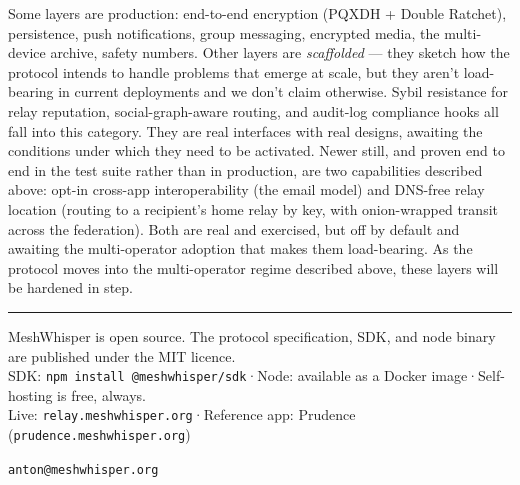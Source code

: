\documentclass[11pt, a4paper]{article}
\begin{document}
Some layers are production: end-to-end encryption (PQXDH + Double Ratchet), persistence, push notifications, group messaging, encrypted media, the multi-device archive, safety numbers. Other layers are \emph{scaffolded} --- they sketch how the protocol intends to handle problems that emerge at scale, but they aren't load-bearing in current deployments and we don't claim otherwise. Sybil resistance for relay reputation, social-graph-aware routing, and audit-log compliance hooks all fall into this category. They are real interfaces with real designs, awaiting the conditions under which they need to be activated. Newer still, and proven end to end in the test suite rather than in production, are two capabilities described above: opt-in cross-app interoperability (the email model) and DNS-free relay location (routing to a recipient's home relay by key, with onion-wrapped transit across the federation). Both are real and exercised, but off by default and awaiting the multi-operator adoption that makes them load-bearing. As the protocol moves into the multi-operator regime described above, these layers will be hardened in step.

\vspace{16pt}
\hrule
\vspace{10pt}
{\small
MeshWhisper is open source. The protocol specification, SDK, and node binary are published under the MIT licence.\\
SDK: \texttt{npm install @meshwhisper/sdk}\quad·\quad Node: available as a Docker image\quad·\quad Self-hosting is free, always.\\
Live: \texttt{relay.meshwhisper.org}\quad·\quad Reference app: Prudence (\texttt{prudence.meshwhisper.org})

\vspace{6pt}
\texttt{anton@meshwhisper.org}
}
\end{document}
